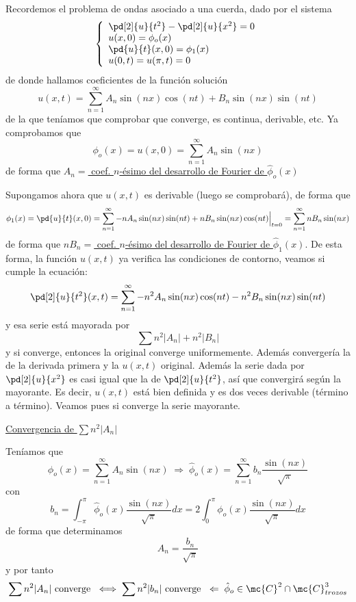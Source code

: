     \begin{eje}Recordemos el problema de ondas asociado a una cuerda, dado por el sistema
        $$\left\{ \begin{array}{l}
         \pd[2]{u}{t^2} -\pd[2]{u}{x^2}=0  \\
         u(x,0)=\phi_o(x) \\
         \pd{u}{t}(x,0)=\phi_1(x) \\
         u(0,t)=u(\pi,t)=0
    \end{array}
    \right.$$
    de donde hallamos coeficientes de la función solución
    $$u(x,t)=\sum_{n=1}^{\infty} A_n \sin(nx) \cos(nt) + B_n \sin(nx) \sin(nt) $$
    de la que teníamos que comprobar que converge, es continua, derivable, etc. Ya comprobamos que 
    $$\phi_o(x)=u(x,0)=\sum_{n=1}^{\infty} A_n \sin(nx)$$
    de forma que \underline{$A_n=$ coef. $n$-ésimo del desarrollo de Fourier de $\hat{\phi}_o(x)$}

    Supongamos ahora que $u(x,t)$ es derivable (luego se comprobará), de forma que
    $$\phi_1(x)=\pd{u}{t}(x,0)=\sum_{n=1}^{\infty} - n A_n \sin(nx) \sin (nt) +  n B_n \sin(nx) \cos(nt) \Big|_{t=0}=\sum_{n=1}^{\infty} n B_n \sin(nx)$$
    de forma que \underline{$n B_n=$ coef. $n$-ésimo del desarrollo de Fourier de $\hat{\phi}_1(x)$}. De esta forma, la función $u(x,t)$ ya verifica las condiciones de contorno, veamos si cumple la ecuación:
    $$\pd[2]{u}{t^2} (x,t)=\sum_{n=1}^{\infty} - n^2 A_n \sin(nx) \cos(nt)-n^2 B_n \sin(nx) \sin(nt)$$
    y esa serie está mayorada por
    $$\sum n^2 |A_n| + n^2 |B_n|$$
    y si converge, entonces la original converge uniformemente. Además convergería la de la derivada primera y la $u(x,t)$ original. Además la serie dada por $\pd[2]{u}{x^2}$ es casi igual que la de $\pd[2]{u}{t^2}$, así que convergirá según la mayorante. Es decir, $u(x,t)$ está bien definida y es dos veces derivable (término a término). Veamos pues si converge la serie mayorante.

    \underline{Convergencia de $\sum n^2 |A_n|$}

    Teníamos que
    $$\phi_o(x) = \sum_{n=1}^{\infty} A_n \sin(nx) \; \Rightarrow \; \hat{\phi}_o(x)=\sum_{n=1}^{\infty} b_n \dfrac{\sin(nx)}{\sqrt{\pi}} $$
    con 
    $$b_n = \int_{-\pi}^{\pi} \hat{\phi}_o(x) \dfrac{\sin(nx)}{\sqrt{\pi}} dx=2\int_{0}^{\pi}\phi_o(x) \dfrac{\sin(nx)}{\sqrt{\pi}} dx$$
    de forma que determinamos 
    $$A_n=\dfrac{b_n}{\sqrt{\pi}}$$
    y por tanto
    $$\sum n^2 |A_n| \text{ converge } \iff \sum n^2 |b_n| \text{ converge } \; \Leftarrow \; \hat{\phi}_o \in \mc{C}^2 \cap \mc{C}^3_{trozos}$$


\end{eje}
